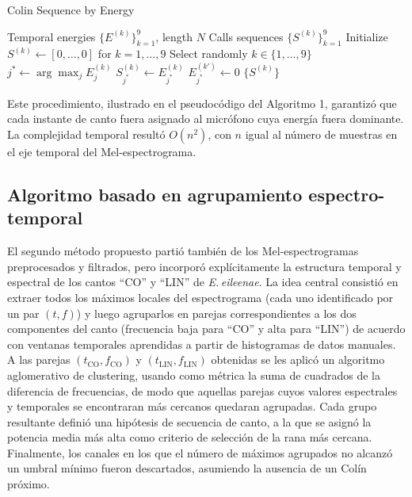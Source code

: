 \begin{algorithm}
    \caption{Colin Sequence by Energy}
    \begin{algorithmic}[1]
    \Require 
      Temporal energies \(\{E^{(k)}\}_{k=1}^9\), length \(N\)
    \Ensure
      Calls sequences \(\{S^{(k)}\}_{k=1}^9\)
    \State Initialize \(S^{(k)} \leftarrow [0,\dots,0]\) for \(k=1,\dots,9\)
      \State Select randomly \(k\in\{1,\dots,9\}\)
      \State \(j^* \leftarrow \arg\max_j E^{(k)}_j\)
      \State \(S^{(k)}_{j^*} \leftarrow E^{(k)}_{j^*}\)
        \State \(E^{(k')}_{j^*} \leftarrow 0\)
      \EndFor
    \EndWhile
    \State \Return \(\{S^{(k)}\}\)
    \end{algorithmic}
\end{algorithm}

Este procedimiento, ilustrado en el pseudocódigo del 
Algoritmo 1, garantizó que cada instante de canto fuera 
asignado al micrófono cuya energía fuera dominante. 
La complejidad temporal resultó \(O(n^2)\), con \(n\) igual al 
número de muestras en el eje temporal del Mel-espectrograma.



\subsection{Algoritmo basado en agrupamiento espectro-temporal}
\label{sec:alg_aglomerativo}

El segundo método propuesto partió también de los 
Mel-espectrogramas preprocesados y filtrados, pero incorporó 
explícitamente la estructura temporal y espectral de los cantos 
“CO” y “LIN” de \emph{E.\,eileenae}. La idea central consistió 
en extraer todos los máximos locales del espectrograma (cada 
uno identificado por un par \((t,f)\)) y luego agruparlos en 
parejas correspondientes a los dos componentes del canto 
(frecuencia baja para “CO” y alta para “LIN”) de acuerdo con 
ventanas temporales aprendidas a partir de histogramas de datos 
manuales. A las parejas \((t_{\mathrm{CO}},f_{\mathrm{CO}})\) y 
\((t_{\mathrm{LIN}},f_{\mathrm{LIN}})\) obtenidas se les aplicó 
un algoritmo aglomerativo de clustering, usando como métrica la 
suma de cuadrados de la diferencia de frecuencias, de modo que 
aquellas parejas cuyos valores espectrales y temporales se 
encontraran más cercanos quedaran agrupadas. Cada grupo 
resultante definió una hipótesis de secuencia de canto, a la que 
se asignó la potencia media más alta como criterio de selección 
de la rana más cercana. Finalmente, los canales en los que el 
número de máximos agrupados no alcanzó un umbral mínimo fueron 
descartados, asumiendo la ausencia de un Colín próximo.  

